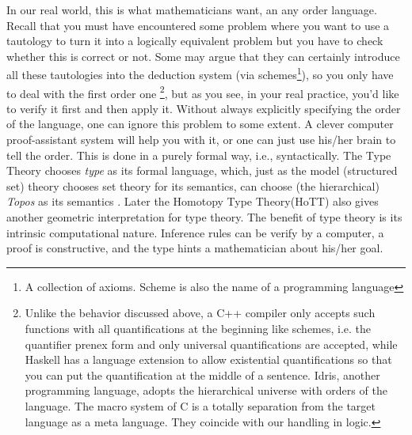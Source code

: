 \documentclass[12pt,a4paper]{report}
\begin{document}
In our real world, this is what mathematicians want, an any order
language. Recall that you must have encountered some problem where
you want to use a tautology to turn it into a logically equivalent
problem but you have to check whether this is correct or not. Some
may argue that they can certainly introduce all these tautologies
into the deduction system (via schemes\footnote{A collection of
axioms. Scheme is also the name of a programming language}), so you 
only have to deal with the first order one \footnote{Unlike the behavior 
discussed above, a C++ compiler only accepts such functions with all 
quantifications at the beginning like schemes, i.e. the quantifier 
prenex form and only universal quantifications are accepted, while 
Haskell has a language extension to allow existential quantifications 
so that you can put the quantification at the middle of a sentence.
Idris, another programming language, adopts the hierarchical universe
with orders of the language. The macro system of C is a totally 
separation from the target language as a meta language. They coincide
with our handling in logic.}, but as you see, in your real practice, 
you'd like to verify it first and then apply it. Without always 
explicitly specifying the order of the language, one can ignore this 
problem to some extent. A clever computer proof-assistant system will 
help you with it, or one can just use his/her brain to tell the order. 
This is done in a purely formal way, i.e., syntactically. The 
Type Theory \cite{intuitionistic-type-theory} chooses {\it type}
as its formal language, which, just as the model (structured set)
theory chooses set theory for its semantics, can choose 
(the hierarchical) {\it Topos} as its semantics 
\cite{Introduction-to-higher-order-categorical-logic,
categorical-logic-and-type-theory}. Later the Homotopy Type Theory(HoTT)
\cite{homotopy-type-theory,univalence} also gives another 
geometric interpretation for type theory. The benefit of type
theory is its intrinsic computational nature. Inference rules
can be verify by a computer, a proof is constructive, 
and the type hints a mathematician about his/her goal\cite{coq}.
\end{document}
